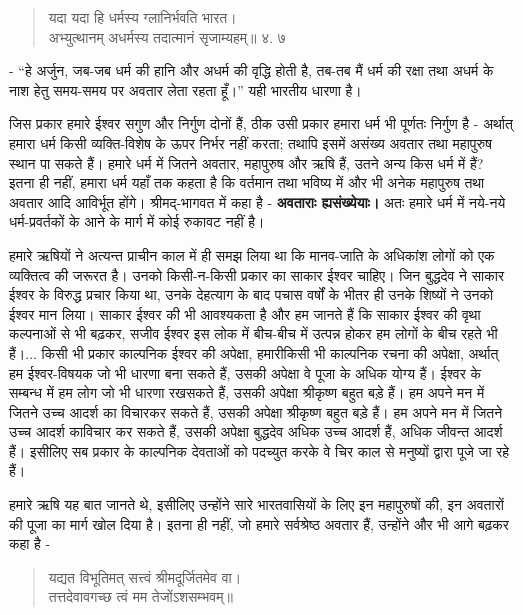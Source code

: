 \begin{verse}
यदा यदा हि धर्मस्य ग्लानिर्भवति भारत।\\अभ्युत्थानम् अधर्मस्य तदात्मानं सृजाम्यहम्॥ ४. ७ 
\end{verse}

\newpage

- “हे अर्जुन, जब-जब धर्म की हानि और अधर्म की वृद्धि होती है, तब-तब मैं धर्म की रक्षा तथा अधर्म के नाश हेतु समय-समय पर अवतार लेता रहता हूँ।” यही भारतीय धारणा है। 

जिस प्रकार हमारे ईश्वर सगुण और निर्गुण दोनों हैं, ठीक उसी प्रकार हमारा धर्म भी पूर्णतः निर्गुण है - अर्थात् हमारा धर्म किसी व्यक्ति-विशेष के ऊपर निर्भर नहीं करता; तथापि इसमें असंख्य अवतार तथा महापुरुष स्थान पा सकते हैं। हमारे धर्म में जितने अवतार, महापुरुष और ऋषि हैं, उतने अन्य किस धर्म में हैं? इतना ही नहीं, हमारा धर्म यहाँ तक कहता है कि वर्तमान तथा भविष्य में और भी अनेक महापुरुष तथा अवतार आदि आविर्भूत होंगे। श्रीमद्-भागवत में कहा है - \textbf{अवताराः ह्यसंख्येयाः। } अतः हमारे धर्म में नये-नये धर्म-प्रवर्तकों के आने के मार्ग में कोई रुकावट नहीं है। 

हमारे ऋषियों ने अत्यन्त प्राचीन काल में ही समझ लिया था कि मानव-जाति के अधिकांश लोगों को एक व्यक्तित्व की जरूरत है। उनको किसी-न-किसी प्रकार का साकार ईश्वर चाहिए। जिन बुद्धदेव ने साकार ईश्वर के विरुद्ध प्रचार किया था, उनके देहत्याग के बाद पचास वर्षों के भीतर ही उनके शिष्यों ने उनको ईश्वर मान लिया। साकार ईश्वर की भी आवश्यकता है और हम जानते हैं कि साकार ईश्वर की वृथा कल्पनाओं से भी बढ़कर, सजीव ईश्वर इस लोक में बीच-बीच में उत्पन्न होकर हम लोगों के बीच रहते भी हैं।... किसी भी प्रकार काल्पनिक ईश्वर की अपेक्षा, हमारी\break किसी भी काल्पनिक रचना की अपेक्षा, अर्थात् हम ईश्वर-विषयक जो भी धारणा बना सकते हैं, उसकी अपेक्षा वे पूजा के अधिक योग्य हैं। ईश्वर के सम्बन्ध में हम लोग जो भी धारणा रख\break सकते हैं, उसकी अपेक्षा श्रीकृष्ण बहुत बड़े हैं। हम अपने मन में जितने उच्च आदर्श का विचार\break कर सकते हैं, उसकी अपेक्षा श्रीकृष्ण बहुत बड़े हैं। हम अपने मन में जितने उच्च आदर्श का\break विचार कर सकते हैं, उसकी अपेक्षा बुद्धदेव अधिक उच्च आदर्श हैं, अधिक जीवन्त आदर्श हैं। इसीलिए सब प्रकार के काल्पनिक देवताओं को पदच्युत करके वे चिर काल से मनुष्यों द्वारा पूजे जा रहे हैं। 

हमारे ऋषि यह बात जानते थे, इसीलिए उन्होंने सारे भारतवासियों के लिए इन महापुरुषों की, इन अवतारों की पूजा का मार्ग खोल दिया है। इतना ही नहीं, जो हमारे सर्वश्रेष्ठ अवतार हैं, उन्होंने और भी आगे बढ़कर कहा है -

\begin{verse}
यद्यत विभूतिमत् सत्त्वं श्रीमदूर्जितमेव वा।\\तत्तदेवावगच्छ त्वं मम तेजोंऽशसम्भवम्॥  
\end{verse}

